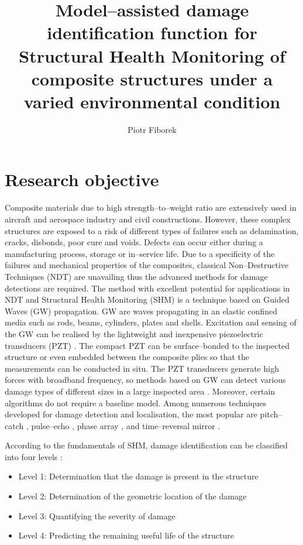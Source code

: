 \documentclass[a4paper,12pt]{article}
\author{Piotr Fiborek}
\date{}
\title{Model--assisted damage identification function for Structural Health Monitoring of composite structures under a varied environmental condition}
\begin{document}
\section{Research objective}
Composite materials due to high strength--to--weight ratio are extensively used in aircraft and aerospace industry and civil constructions. However, these complex structures are exposed to a risk of different types of failures such as delamination, cracks, disbonds, poor cure and voids. Defects can occur either during a manufacturing process, storage or in--service life. Due to a specificity of the failures and mechanical properties of the composites, classical Non--Destructive Techniques (NDT) are unavailing thus the advanced methods for damage detections are required. The method with excellent potential for applications in NDT and Structural Health Monitoring (SHM) is a technique based on Guided Waves (GW) propagation. GW are waves propagating in an elastic confined media such as rods, beams, cylinders, plates and shells. Excitation and sensing of the GW can be realised by the lightweight and inexpensive piezoelectric transducers (PZT) \cite{giurgiutiumicromechatronics}. The compact PZT can be surface--bonded to the inspected structure or even embedded between the composite plies so that the measurements can be conducted in situ. The PZT transducers generate high forces with broadband frequency, so methods based on GW can detect various damage types of different sizes in a large inspected area \cite{su2006guided}. Moreover, certain algorithms do not require a baseline model. Among numerous techniques developed for damage detection and localisation, the most popular are pitch--catch \cite{ihn2008pitch, sikdar2017structural}, pulse--echo \cite{guo1993interaction, kudela2008damage}, phase array \cite{lu2006crack, ostachowicz2008elastic}, and time--reversal mirror \cite{fink1992time, eremin2016analytically}.

According to the fundamentals of SHM, damage identification can be classified into four levels \cite{guemes2010smart}:
\begin{itemize}
	\item Level 1: Determination that the damage is present in the structure
	\item Level 2: Determination of the geometric location of the damage
	\item Level 3: Quantifying the severity of damage
	\item Level 4: Predicting the remaining useful life of the structure
\end{itemize}
\end{document}
